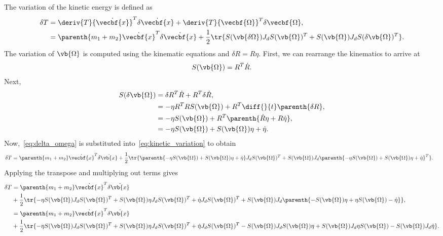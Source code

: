 \documentclass[11pt, reqno]{article}    %
\begin{document}
The variation of the kinetic energy is defined as
\begin{align}\label{eq:kinetic_variation}
    \delta T &= \deriv{T}{\dot{\vecbf{x}}}^T \delta \dot{\vecbf{x}} + \deriv{T}{\vecbf{\Omega}}^T \delta \vecbf{\Omega} , \\
    &=   \parenth{m_1 + m_2} \dot{\vecbf{x}}^T \delta \dot{\vecbf{x}} + \frac{1}{2} \tr{ S(\vb{\delta \Omega}) J_d S(\vb{\Omega})^T + S(\vb{\Omega}) J_d S(\delta \vb{\Omega})^T}.
\end{align}
The variation of \( \vb{\Omega} \) is computed using the kinematic equations and \( \delta R = R \eta\).
First, we can rearrange the kinematics to arrive at
\begin{align*}
    S(\vb{\Omega}) = R^T \dot{R}.
\end{align*}
Next,
\begin{align}\label{eq:delta_omega}
    S(\delta \vb{\Omega}) &= \delta R^T \dot{R} + R^T \delta \dot{R} , \nonumber \\
    &= - \eta R^T R S(\vb{\Omega}) + R^T \diff{}{t} \parenth{\delta R}, \nonumber\\
    &= -\eta S(\vb{\Omega}) + R^T \parenth{\dot{R}\eta + R \dot{\eta}}, \nonumber \\
    &= -\eta S(\vb{\Omega}) + S(\vb{\Omega}) \eta + \dot{\eta}  . 
\end{align}
Now,~\cref{eq:delta_omega} is substituted into~\cref{eq:kinetic_variation} to obtain
\begin{align*}
    \delta T &=  \parenth{m_1 + m_2} \dot{\vecbf{x}}^T \delta \dot{\vb{x}} + \frac{1}{2} \tr{\parenth{-\eta S(\vb{\Omega}) + S(\vb{\Omega}) \eta + \dot{\eta}} J_d S(\vb{\Omega})^T + S(\vb{\Omega}) J_d \parenth{-\eta S(\vb{\Omega}) + S(\vb{\Omega}) \eta + \dot{\eta}}^T} .
\end{align*}
Applying the transpose and multiplying out terms gives
\begin{align*}
    \delta T &=  \parenth{m_1 + m_2} \dot{\vecbf{x}}^T \delta \dot{\vb{x}} \\
    &+ \frac{1}{2} \tr{ -\eta S(\vb{\Omega}) J_d S(\vb{\Omega})^T + S(\vb{\Omega})\eta J_d S(\vb{\Omega})^T + \dot{\eta}J_d S(\vb{\Omega})^T + S(\vb{\Omega}) J_d \parenth{-S(\vb{\Omega}) \eta + \eta S(\vb{\Omega}) - \dot{\eta}}} , \\
    &=  \parenth{m_1 + m_2} \dot{\vecbf{x}}^T \delta \dot{\vb{x}} \\
    &+ \frac{1}{2} \tr{-\eta S(\vb{\Omega}) J_d S(\vb{\Omega})^T + S(\vb{\Omega})\eta J_d S(\vb{\Omega})^T + \dot{\eta}J_d S(\vb{\Omega})^T -S(\vb{\Omega}) J_d S(\vb{\Omega}) \eta + S(\vb{\Omega}) J_d \eta S(\vb{\Omega}) - S(\vb{\Omega}) J_d \dot{\eta} } .
\end{align*}
\end{document}
